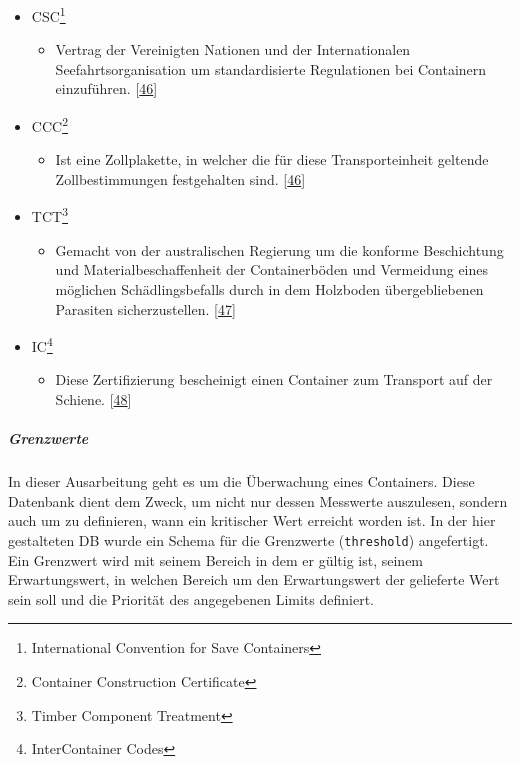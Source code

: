 \documentclass[
    headings=optiontotocandhead,%
    twoside,
    numbers=noenddot,%
    12pt, %
    titlepage, %
    parskip=full, %
    listof=leveldown, 
    numbers=noenddot, %
    a4paper,DIV=14,
    BCOR=15mm,
]{scrbook}
\newcommand{\passthrough}[1]{#1}
\providecommand{\tightlist}{%
  \setlength{\itemsep}{0pt}\setlength{\parskip}{0pt}}
\begin{document}
\begin{itemize}
\tightlist
\item
  CSC\footnote{International Convention for Save Containers}

  \begin{itemize}
  \tightlist
  \item
    Vertrag der Vereinigten Nationen und der Internationalen
    Seefahrtsorganisation um standardisierte Regulationen bei Containern
    einzuführen. {[}\protect\hyperlink{ref-bic-code-csc}{46}{]}
  \end{itemize}
\item
  CCC\footnote{Container Construction Certificate}

  \begin{itemize}
  \tightlist
  \item
    Ist eine Zollplakette, in welcher die für diese Transporteinheit
    geltende Zollbestimmungen festgehalten sind.
    {[}\protect\hyperlink{ref-bic-code-csc}{46}{]}
  \end{itemize}
\item
  TCT\footnote{Timber Component Treatment}

  \begin{itemize}
  \tightlist
  \item
    Gemacht von der australischen Regierung um die konforme Beschichtung
    und Materialbeschaffenheit der Containerböden und Vermeidung eines
    möglichen Schädlingsbefalls durch in dem Holzboden übergebliebenen
    Parasiten sicherzustellen. {[}\protect\hyperlink{ref-tct}{47}{]}
  \end{itemize}
\item
  IC\footnote{InterContainer Codes}

  \begin{itemize}
  \tightlist
  \item
    Diese Zertifizierung bescheinigt einen Container zum Transport auf
    der Schiene. {[}\protect\hyperlink{ref-ic-codes}{48}{]}
  \end{itemize}
\end{itemize}

\hypertarget{grenzwerte}{%
\subparagraph{Grenzwerte}\label{grenzwerte}}

In dieser Ausarbeitung geht es um die Überwachung eines Containers.
Diese Datenbank dient dem Zweck, um nicht nur dessen Messwerte
auszulesen, sondern auch um zu definieren, wann ein kritischer Wert
erreicht worden ist. In der hier gestalteten DB wurde ein Schema für die
Grenzwerte (\passthrough{\lstinline!threshold!}) angefertigt. Ein
Grenzwert wird mit seinem Bereich in dem er gültig ist, seinem
Erwartungswert, in welchen Bereich um den Erwartungswert der gelieferte
Wert sein soll und die Priorität des angegebenen Limits definiert.
\end{document}
